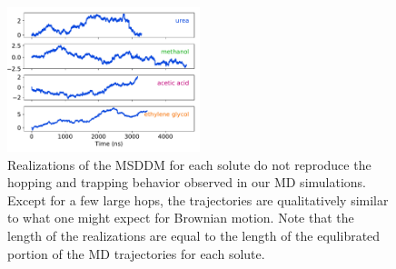 \documentclass{article}
\begin{document}
  \begin{figure}
  \centering
  \includegraphics[width=0.5\textwidth]{msddm_realizations.pdf}
  \caption{Realizations of the MSDDM for each solute do not reproduce the hopping
  and trapping behavior observed in our MD simulations. Except for a few large 
  hops, the trajectories are qualitatively similar to what one might expect for
  Brownian motion. Note that the length of the realizations are equal to the length
  of the equlibrated portion of the MD trajectories for each solute.}\label{fig:msddm_eyetest}
  \end{figure}
  
  
\end{document}
